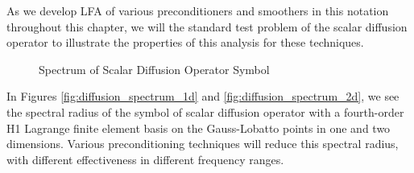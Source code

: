 As we develop LFA of various preconditioners and smoothers in this notation throughout this chapter, we will the standard test problem of the scalar diffusion operator to illustrate the properties of this analysis for these techniques.

\begin{figure}[!h]
  \centering
  \hfill
  \caption{Spectrum of Scalar Diffusion Operator Symbol}
\end{figure}

In Figures \ref{fig:diffusion_spectrum_1d} and \ref{fig:diffusion_spectrum_2d}, we see the spectral radius of the symbol of scalar diffusion operator with a fourth-order H1 Lagrange finite element basis on the Gauss-Lobatto points in one and two dimensions.
Various preconditioning techniques will reduce this spectral radius, with different effectiveness in different frequency ranges.
